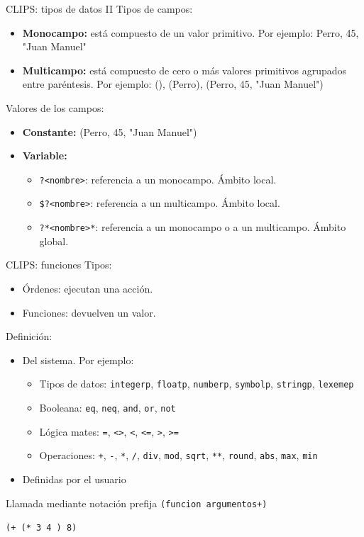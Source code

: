 \documentclass[usenames,dvipsnames,aspectratio=169]{beamer}
\begin{document}
\begin{frame}{CLIPS: tipos de datos II}
	Tipos de campos:
	\begin{itemize}
		\item \textbf{Monocampo:} está compuesto de un valor primitivo. Por ejemplo: Perro, 45, "Juan Manuel"
		\item \textbf{Multicampo:} está compuesto de cero o más valores primitivos agrupados entre paréntesis. Por ejemplo: (), (Perro), (Perro, 45, "Juan Manuel")
	\end{itemize}
	Valores de los campos:
	\begin{itemize}
		\item \textbf{Constante:} (Perro, 45, "Juan Manuel")
		\item \textbf{Variable:}
		\begin{itemize}
			\item \texttt{?<nombre>}: referencia a un monocampo. Ámbito local.
			\item \texttt{\$?<nombre>}: referencia a un multicampo. Ámbito local.
			\item \texttt{?*<nombre>*}: referencia a un monocampo o a un multicampo. Ámbito global.
		\end{itemize}
	\end{itemize}
\end{frame}

\begin{frame}{CLIPS: funciones}
	Tipos:
	\begin{itemize}
		\item Órdenes: ejecutan una acción.
		\item Funciones: devuelven un valor.
	\end{itemize}
	Definición:
	\begin{itemize}
		\item Del sistema. Por ejemplo:
		\begin{itemize}
			\item Tipos de datos: \texttt{integerp}, \texttt{floatp}, \texttt{numberp}, \texttt{symbolp}, \texttt{stringp}, \texttt{lexemep}
			\item Booleana: \texttt{eq}, \texttt{neq}, \texttt{and}, \texttt{or}, \texttt{not}
			\item Lógica mates: \texttt{=}, \texttt{<>}, \texttt{<}, \texttt{<=}, \texttt{>}, \texttt{>=}
			\item Operaciones: \texttt{+}, \texttt{-}, \texttt{*}, \texttt{/}, \texttt{div}, \texttt{mod}, \texttt{sqrt}, \texttt{**}, \texttt{round}, \texttt{abs}, \texttt{max}, \texttt{min}
		\end{itemize}
		\item Definidas por el usuario
	\end{itemize}
	\begin{block}{\small Llamada mediante notación prefija}
		\small
		\texttt{(funcion argumentos+)}
		
		\texttt{(+ (* 3 4 ) 8)}
	\end{block}
\end{frame}
\end{document}
